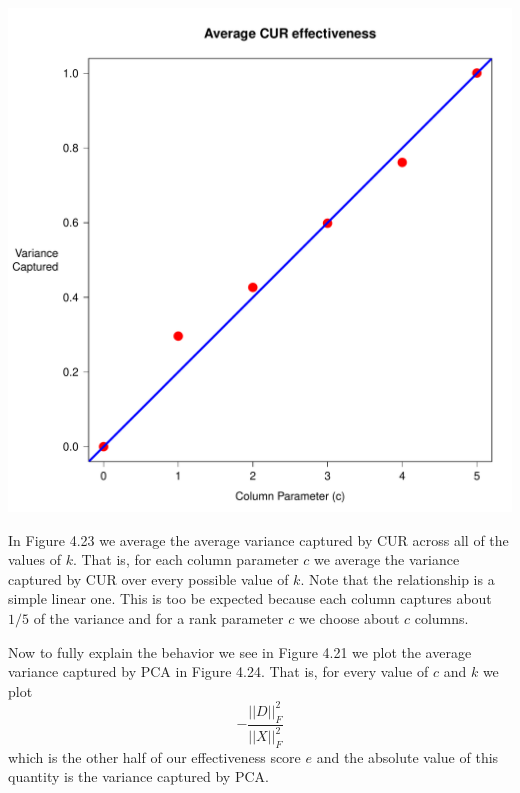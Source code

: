 \documentclass{book}
\begin{document}
\begin{center}
\includegraphics[scale=.3]{./Figures/cs_ex_1/avg_cur_effect.pdf}
\end{center}

In Figure 4.23 we average the average variance captured by CUR across all of the values of $k$. That is, for each column parameter $c$ we average the variance captured by CUR over every possible value of $k$. Note that the relationship is a simple linear one. This is too be expected because each column captures about $1/5$ of the variance and for a rank parameter $c$ we choose about $c$ columns. 

Now to fully explain the behavior we see in Figure 4.21 we plot the average variance captured by PCA in Figure 4.24. That is, for every value of $c$ and $k$ we plot
$$
-\frac{||D||_F^2}{||X||_F^2}
$$
which is the other half of our effectiveness score $e$ and the absolute value of this quantity is the variance captured by PCA. 
\end{document}
